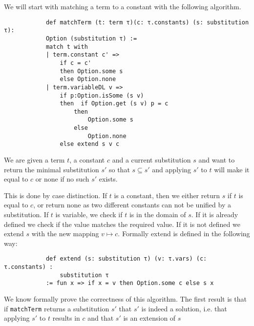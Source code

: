 \documentclass{article}
\begin{document}
        We will start with matching a term to a constant with the following algorithm.

        \begin{lstlisting}
            def matchTerm (t: term τ)(c: τ.constants) (s: substitution τ):
            Option (substitution τ) :=
            match t with
            | term.constant c' =>
                if c = c'
                then Option.some s
                else Option.none
            | term.variableDL v =>
                if p:Option.isSome (s v)
                then  if Option.get (s v) p = c
                    then
                        Option.some s
                    else
                        Option.none
                else extend s v c
        \end{lstlisting}

        We are given a term $t$, a constant $c$ and a current substitution $s$ and want to return the minimal substitution $s'$ so that $s \subseteq s'$ and applying $s'$ to $t$ will make it equal to $c$ or none if no such $s'$ exists.

        This is done by case distinction. If $t$ is a constant, then we either return $s$ if $t$ is equal to $c$, or return none as two different constants can not be unified by a substitution. If $t$ is variable, we check if $t$ is in the domain of $s$. If it is already defined we check if the value matches the required value. If it is not defined we extend $s$ with the new mapping $v \mapsto c$.
        Formally extend is defined in the following way:

        \begin{lstlisting}
            def extend (s: substitution τ) (v: τ.vars) (c: τ.constants) :
                substitution τ 
            := fun x => if x = v then Option.some c else s x
        \end{lstlisting}

        We know formally prove the correctness of this algorithm. The first result is that if \texttt{matchTerm} returns a substitution $s'$ that $s'$ is indeed a solution, i.e. that applying $s'$ to $t$ results in $c$ and that $s'$ is an extension of $s$
\end{document}

